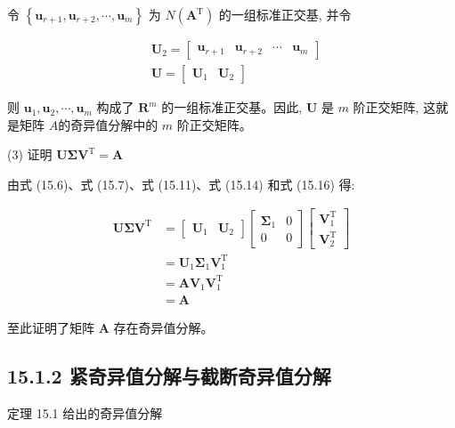 \documentclass[10pt]{article}
\begin{document}
令 $\left\{\boldsymbol{u}_{r+1}, \boldsymbol{u}_{r+2}, \cdots, \boldsymbol{u}_{m}\right\}$ 为 $N\left(\boldsymbol{A}^{\mathrm{T}}\right)$ 的一组标准正交基, 并令


\begin{align*}
& \boldsymbol{U}_{2}=\left[\begin{array}{llll}
\boldsymbol{u}_{r+1} & \boldsymbol{u}_{r+2} & \cdots & \boldsymbol{u}_{m}
\end{array}\right] \\
& \boldsymbol{U}=\left[\begin{array}{ll}
\boldsymbol{U}_{1} & \boldsymbol{U}_{2}
\end{array}\right] \tag{15.16}
\end{align*}


则 $\boldsymbol{u}_{1}, \boldsymbol{u}_{2}, \cdots, \boldsymbol{u}_{m}$ 构成了 $\boldsymbol{R}^{m}$ 的一组标准正交基。因此, $\boldsymbol{U}$ 是 $m$ 阶正交矩阵, 这就是矩阵 $A$的奇异值分解中的 $m$ 阶正交矩阵。

(3) 证明 $\boldsymbol{U} \boldsymbol{\Sigma} \boldsymbol{V}^{\mathrm{T}}=\boldsymbol{A}$

由式 (15.6)、式 (15.7)、式 (15.11)、式 (15.14) 和式 (15.16) 得:


\begin{align*}
\boldsymbol{U} \boldsymbol{\Sigma} \boldsymbol{V}^{\mathrm{T}} & =\left[\begin{array}{ll}
\boldsymbol{U}_{1} & \boldsymbol{U}_{2}
\end{array}\right]\left[\begin{array}{cc}
\boldsymbol{\Sigma}_{1} & 0 \\
0 & 0
\end{array}\right]\left[\begin{array}{l}
\boldsymbol{V}_{1}^{\mathrm{T}} \\
\boldsymbol{V}_{2}^{\mathrm{T}}
\end{array}\right] \\
& =\boldsymbol{U}_{1} \boldsymbol{\Sigma}_{1} \boldsymbol{V}_{1}^{\mathrm{T}} \\
& =\boldsymbol{A} \boldsymbol{V}_{1} \boldsymbol{V}_{1}^{\mathrm{T}} \\
& =\boldsymbol{A} \tag{15.17}
\end{align*}


至此证明了矩阵 $\boldsymbol{A}$ 存在奇异值分解。

\subsection*{15.1.2 紧奇异值分解与截断奇异值分解}
定理 15.1 给出的奇异值分解
\end{document}
